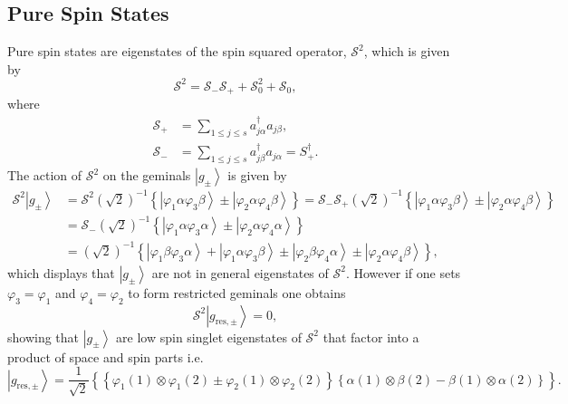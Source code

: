 \documentclass[aps,preprint]{revtex4}%
\begin{document}
\subsection{Pure Spin States \label{SpinB}}

Pure spin states are eigenstates of the spin squared operator, $\mathcal{S}%
^{2}$, which is given by
\begin{equation}
\mathcal{S}^{2}=\mathcal{S}_{-}\mathcal{S}_{+}+\mathcal{S}_{0}^{2}%
+\mathcal{S}_{0},
\end{equation}
where
\begin{align}
\mathcal{S}_{+}  &  =\sum_{1\leq j\leq s}a_{j\alpha}^{\dagger}a_{j\beta},\\
\mathcal{S}_{-}  &  =\sum_{1\leq j\leq s}a_{j\beta}^{\dagger}a_{j\alpha}%
=S_{+}^{\dagger}.
\end{align}
The action of $\mathcal{S}^{2}$ on the geminals $\left\vert g_{\pm
}\right\rangle $ is given by
\begin{align}
\mathcal{S}^{2}\left\vert g_{\pm}\right\rangle  &  =\mathcal{S}^{2}\left(
\sqrt{2}\right)  ^{-1}\left\{  \left\vert \varphi_{1}\alpha\varphi_{3}%
\beta\right\rangle \pm\left\vert \varphi_{2}\alpha\varphi_{4}\beta
\right\rangle \right\}  =\mathcal{S}_{-}\mathcal{S}_{+}\left(  \sqrt
{2}\right)  ^{-1}\left\{  \left\vert \varphi_{1}\alpha\varphi_{3}%
\beta\right\rangle \pm\left\vert \varphi_{2}\alpha\varphi_{4}\beta
\right\rangle \right\} \nonumber\\
&  =\mathcal{S}_{-}\left(  \sqrt{2}\right)  ^{-1}\left\{  \left\vert
\varphi_{1}\alpha\varphi_{3}\alpha\right\rangle \pm\left\vert \varphi
_{2}\alpha\varphi_{4}\alpha\right\rangle \right\} \nonumber\\
&  =\left(  \sqrt{2}\right)  ^{-1}\left\{  \left\vert \varphi_{1}\beta
\varphi_{3}\alpha\right\rangle +\left\vert \varphi_{1}\alpha\varphi_{3}%
\beta\right\rangle \pm\left\vert \varphi_{2}\beta\varphi_{4}\alpha
\right\rangle \pm\left\vert \varphi_{2}\alpha\varphi_{4}\beta\right\rangle
\right\}  ,
\end{align}
which displays that $\left\vert g_{\pm}\right\rangle $ are not in general
eigenstates of $\mathcal{S}^{2}$. However if one sets $\varphi_{3}=\varphi
_{1}$ and $\varphi_{4}=\varphi_{2}$ to form restricted geminals one obtains
\begin{equation}
\mathcal{S}^{2}\left\vert g_{\text{res},\pm}\right\rangle =0,
\end{equation}
showing that $\left\vert g_{\pm}\right\rangle $ are low spin singlet
eigenstates of $\mathcal{S}^{2}$ that factor into a product of space and spin
parts i.e.
\begin{equation}
\left\vert g_{\text{res},\pm}\right\rangle =\frac{1}{\sqrt{2}}\left\{
\left\{  \varphi_{1}\left(  1\right)  \otimes\varphi_{1}\left(  2\right)
\pm\varphi_{2}\left(  1\right)  \otimes\varphi_{2}\left(  2\right)  \right\}
\left\{  \alpha\left(  1\right)  \otimes\beta\left(  2\right)  -\beta\left(
1\right)  \otimes\alpha\left(  2\right)  \right\}  \right\}  .
\end{equation}
\end{document}
